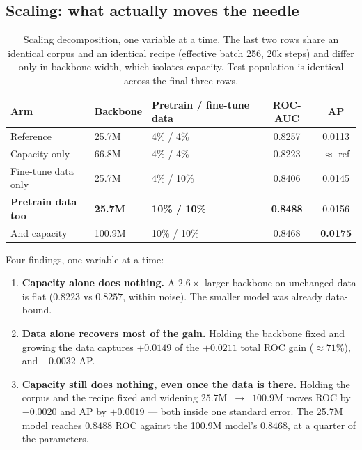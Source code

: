 \documentclass[10pt,letterpaper]{article}
\begin{document}
\subsection{Scaling: what actually moves the needle}
\label{sec:scaling}

\begin{table}[h]
\centering
\begin{tabular}{lllcc}
\toprule
\textbf{Arm} & \textbf{Backbone} & \textbf{Pretrain / fine-tune data} & \textbf{ROC-AUC} & \textbf{AP} \\
\midrule
Reference               & 25.7M  & 4\% / 4\%    & 0.8257 & 0.0113 \\
Capacity only           & 66.8M  & 4\% / 4\%    & 0.8223 & $\approx$ ref \\
Fine-tune data only     & 25.7M  & 4\% / 10\%   & 0.8406 & 0.0145 \\
\textbf{Pretrain data too} & \textbf{25.7M} & \textbf{10\% / 10\%} & \textbf{0.8488} & 0.0156 \\
And capacity            & 100.9M & 10\% / 10\%  & 0.8468 & \textbf{0.0175} \\
\bottomrule
\end{tabular}
\caption{Scaling decomposition, one variable at a time. The last two rows share an identical corpus
and an identical recipe (effective batch 256, 20k steps) and differ only in backbone width, which
isolates capacity. Test population is identical across the final three rows.}
\label{tab:scaling}
\end{table}

Four findings, one variable at a time:
\begin{enumerate}
  \item \textbf{Capacity alone does nothing.} A $2.6\times$ larger backbone on unchanged data is
        flat ($0.8223$ vs $0.8257$, within noise). The smaller model was already data-bound.
  \item \textbf{Data alone recovers most of the gain.} Holding the backbone fixed and growing the
        data captures $+0.0149$ of the $+0.0211$ total ROC gain ($\approx 71\%$), and $+0.0032$ AP.
  \item \textbf{Capacity still does nothing, even once the data is there.} Holding the corpus and
        the recipe fixed and widening $25.7$M~$\rightarrow$~$100.9$M moves ROC by $-0.0020$ and AP by
        $+0.0019$ --- both inside one standard error. The 25.7M model reaches $0.8488$ ROC against
        the 100.9M model's $0.8468$, at a quarter of the parameters.
\end{enumerate}
\end{document}
